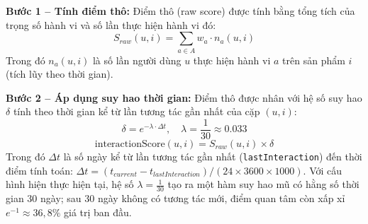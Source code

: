 \documentclass[../DoAn.tex]{subfiles}
\begin{document}
\textbf{Bước 1 -- Tính điểm thô:} Điểm thô (raw score) được tính bằng tổng tích của trọng số hành vi và số lần thực hiện hành vi đó:
\begin{equation}
    S_{raw}(u, i) = \sum_{a \in A} w_a \cdot n_a(u, i)
\end{equation}
Trong đó $n_a(u, i)$ là số lần người dùng $u$ thực hiện hành vi $a$ trên sản phẩm $i$ (tích lũy theo thời gian).

\textbf{Bước 2 -- Áp dụng suy hao thời gian:} Điểm thô được nhân với hệ số suy hao $\delta$ tính theo thời gian kể từ lần tương tác gần nhất của cặp $(u, i)$:
\begin{equation}
    \delta = e^{-\lambda \cdot \Delta t}, \quad \lambda = \frac{1}{30} \approx 0.033
\end{equation}
\begin{equation}
    \text{interactionScore}(u, i) = S_{raw}(u, i) \times \delta
\end{equation}
Trong đó $\Delta t$ là số ngày kể từ lần tương tác gần nhất (\texttt{lastInteraction}) đến thời điểm tính toán: $\Delta t = (t_{current} - t_{lastInteraction}) / (24 \times 3600 \times 1000)$. Với cấu hình hiện thực hiện tại, hệ số $\lambda = \frac{1}{30}$ tạo ra một hàm suy hao mũ có hằng số thời gian 30 ngày; sau 30 ngày không có tương tác mới, điểm quan tâm còn xấp xỉ $e^{-1} \approx 36{,}8\%$ giá trị ban đầu.
\end{document}
